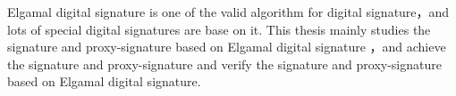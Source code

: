 Elgamal digital signature is one of the valid algorithm for digital signature，and lots of special digital signatures are base on it. This thesis mainly studies the signature and proxy-signature based on Elgamal digital signature ，and achieve the signature and proxy-signature and verify the signature and proxy-signature based on Elgamal digital signature.